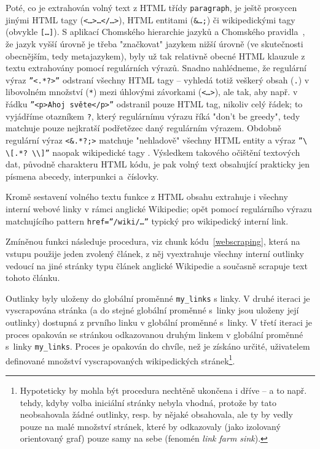 Poté, co je extrahován volný text z HTML třídy \texttt{paragraph}, je
ještě prosycen jinými HTML tagy (\texttt{<\ldots>\ldots</\ldots>}),
HTML entitami (\texttt{\&\ldots;}) či wikipedickými tagy%
 (obvykle
\texttt{[\ldots]}). S aplikací Chomského hierarchie jazyků%
 a Chomského
pravidla~\cite{Chomsky1956}, že jazyk vyšší úrovně je třeba "značkovat"
jazykem nižší úrovně (ve skutečnosti obecnějším, tedy metajazykem), byly už
tak relativně obecné HTML klauzule z textu extrahovány pomocí regulárních
výrazů. Snadno nahlédneme, že regulární výraz \texttt{''<.*?>''} odstraní
všechny HTML tagy -- vyhledá totiž veškerý obsah (\texttt{.}) v libovolném
množství (\texttt{*}) mezi úhlovými závorkami (\texttt{<\ldots>}), ale tak,
aby např. v řádku \texttt{''<p>Ahoj světe</p>''} odstranil pouze HTML tag,
nikoliv celý řádek; to vyjádříme otazníkem \texttt{?}, který regulárnímu výrazu
říká "don't be greedy", tedy matchuje pouze nejkratší podřetězec daný
regulárním výrazem. Obdobně regulární výraz \texttt{<\&.*?;>} matchuje
"nehladově" všechny HTML entity a výraz \texttt{''\textbackslash
\textbackslash [.*? \textbackslash \textbackslash ]''} naopak wikipedické tagy%
.
Výsledkem takového očištění textových dat, původně charakteru HTML kódu,
je pak volný text obsahující prakticky jen písmena abecedy, interpunkci
a~číslovky.

Kromě sestavení volného textu funkce z HTML obsahu extrahuje i všechny
interní webové linky v rámci anglické Wikipedie;
opět pomocí regulárního
výrazu matchujícího pattern \texttt{href=''/wiki/\ldots''} typický pro
wikipedický interní link.

Zmíněnou funkci následuje procedura, viz chunk kódu~\ref{webscraping},
která na vstupu použije jeden zvolený
článek, z něj vyextrahuje všechny interní outlinky vedoucí na jiné
stránky typu článek anglické Wikipedie a současně scrapuje%
 text tohoto článku.

Outlinky byly uloženy do globální proměnné \texttt{my\_links} s linky. V druhé
iteraci je vyscrapována stránka (a do stejné globální proměnné s~linky jsou
uloženy její outlinky) dostupná z prvního linku v globální proměnné s~linky.
V třetí iteraci je proces opakován se stránkou odkazovanou druhým linkem
v globální proměnné s~linky \texttt{my\_links}. Proces je opakován do
chvíle, než je získáno určité, uživatelem definované množství vyscrapovaných
wikipedických stránek\footnote{Hypoteticky by mohla být procedura nechtěně
ukončena i dříve -- a to např. tehdy, kdyby volba iniciální stránky nebyla
vhodná, protože by tato neobsahovala žádné outlinky, resp. by nějaké
obsahovala, ale ty by vedly pouze na malé množství stránek, které by
odkazovaly (jako izolovaný orientovaný graf) pouze samy na sebe
(fenomén \textit{link farm sink}).}.

